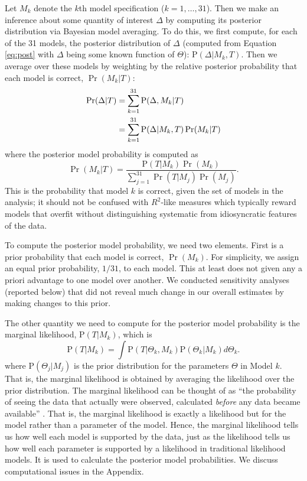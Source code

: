 \documentclass[11pt,titlepage]{article}
\renewcommand{\P}{\text{P}}
\begin{document}
Let $M_k$ denote the $k$th model specification ($k=1,\dots,31$). Then
we make an inference about some quantity of interest $\Delta$ by
computing its posterior distribution via Bayesian model averaging.  To
do this, we first compute, for each of the 31 models, the posterior
distribution of $\Delta$ (computed from Equation \ref{eq:post} with
$\Delta$ being some known function of $\Theta$): $\P(\Delta|M_k,T)$.
Then we average over these models by weighting by the relative
posterior probability that each model is correct, $\Pr(M_k|T)$:
\begin{align} \label{eq:bma}
  \Pr(\Delta|T) &= \sum_{k=1}^{31} \P(\Delta,M_k|T)\notag\\
                &= \sum_{k=1}^{31} \P(\Delta|M_k,T) \Pr(M_k|T)
\end{align}
where the posterior model probability is computed as
\begin{equation}
  \Pr(M_k|T)=\frac{\P(T|M_k)\Pr(M_k)}
             {\sum_{j=1}^{31} \Pr(T|M_j) \Pr(M_j)}.  \label{eq:postmodel}
\end{equation}
This is the probability that model $k$ is correct, given the set of
models in the analysis; it should not be confused with $R^2$-like
measures which typically reward models that overfit without
distinguishing systematic from idiosyncratic features of the data.

To compute the posterior model probability, we need two elements.
First is a prior probability that each model is correct, $\Pr(M_k)$.
For simplicity, we assign an equal prior probability, $1/31$, to each
model.  This at least does not given any a priori advantage to one
model over another.  We conducted sensitivity analyses (reported
below) that did not reveal much change in our overall estimates by
making changes to this prior.

The other quantity we need to compute for the posterior model
probability is the marginal likelihood, $\P(T|M_k)$, which is
\begin{equation}
  \P(T|M_k) = \int \P(T|\Theta_k, M_k) \P(\Theta_k|M_k) d\Theta_k. 
  \label{eq:marglik}
\end{equation} 
where $\P(\Theta_j|M_j)$ is the prior distribution for the parameters
$\Theta$ in Model $k$. That is, the marginal likelihood is obtained by
averaging the likelihood over the prior distribution.  The marginal
likelihood can be thought of as ``the probability of seeing the data
that actually were observed, calculated \emph{before} any data became
available'' \cite[p.776]{kass:raft:95}.  That is, the marginal
likelihood is exactly a likelihood but for the model rather than a
parameter of the model.  Hence, the marginal likelihood tells us how
well each model is supported by the data, just as the likelihood tells
us how well each parameter is supported by a likelihood in traditional
likelihood models.  It is used to calculate the posterior model
probabilities.  We discuss computational issues in the Appendix.
\end{document}
